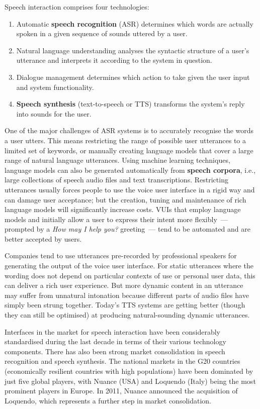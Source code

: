 \begin{multicols}{2}
Speech interaction comprises four technologies: 
\begin{enumerate}
\item Automatic \textbf{speech recognition} (ASR) determines which words are actually spoken in a given sequence of sounds uttered by a user.  
\item Natural language understanding analyses the syntactic structure of a user's utterance and interprets it according to the system in question.  
\item Dialogue management determines which action to take given the user input and system functionality.
\item \textbf{Speech synthesis} (text-to-speech or TTS) transforms the system's reply into sounds for the user. 
\end{enumerate}

One of the major challenges of ASR systems is to accurately recognise the words a user utters.
This means restricting the range of possible user utterances to a limited set of keywords, or manually creating language models that cover a large range of natural language utterances.
Using machine learning techniques, language models can also be generated automatically from \textbf{speech corpora}, i.e., large collections of speech audio files and text transcriptions.
Restricting utterances usually forces people to use the voice user interface in a rigid way and can damage user acceptance; but the creation, tuning and maintenance of rich language models will significantly increase costs.
VUIs that employ language models and initially allow a user to express their intent more flexibly~--- prompted by a \textit{How may I help you?} greeting~--- tend to be automated and are better accepted by users. 

Companies tend to use utterances pre-recorded by professional speakers for generating the output of the voice user interface.
For static utterances where the wording does not depend on particular contexts of use or personal user data, this can deliver a rich user experience.
But more dynamic content in an utterance may suffer from unnatural intonation because different parts of audio files have simply been strung together.
Today's TTS systems are getting better (though they can still be optimised) at producing natural-sounding dynamic utterances.  

Interfaces in the market for speech interaction have been considerably standardised during the last decade in terms of their various technology components.
There has also been strong market consolidation in speech recognition and speech synthesis.
The national markets in the G20 countries (economically resilient countries with high populations) have been dominated by just five global players, with Nuance (USA) and Loquendo (Italy) being the most prominent players in Europe.
In 2011, Nuance announced the acquisition of Loquendo, which represents a further step in market consolidation.


\end{multicols}
